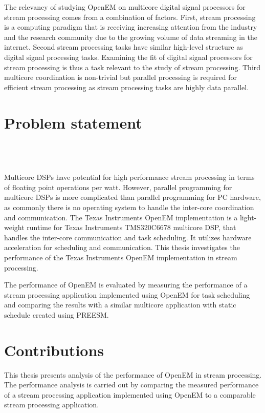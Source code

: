 The relevancy of studying OpenEM on multicore digital signal processors for stream processing comes from a combination of factors. First, stream processing is a computing paradigm that is receiving increasing attention from the industry and the research community due to the growing volume of data streaming in the internet. Second stream processing tasks have similar high-level structure as digital signal processing tasks. Examining the fit of digital signal processors for stream processing is thus a task relevant to the study of stream processing. Third multicore coordination is non-trivial but parallel processing is required for efficient stream processing as stream processing tasks are highly data parallel.

\section{Problem statement}
\label{section:problem-statement}
 \\
 \\
 \\
Multicore DSPs have potential for high performance stream processing in terms of floating point operations per watt. However, parallel programming for multicore DSPs is more complicated than parallel programming for PC hardware, as commonly there is no operating system to handle the inter-core coordination and communication. The Texas Instruments OpenEM implementation is a light-weight runtime for Texas Instruments TMS320C6678 multicore DSP, that handles the inter-core communication and task scheduling. It utilizes hardware acceleration for scheduling and communication. This thesis investigates the performance of the Texas Instruments OpenEM implementation in stream processing.

The performance of OpenEM is evaluated by measuring the performance of a stream processing application implemented using OpenEM for task scheduling and comparing the results with a similar multicore application with static schedule created using PREESM.

\section{Contributions}
\label{section:contributions}
This thesis presents analysis of the performance of OpenEM in stream processing. The performance analysis is carried out by comparing the measured performance of a stream processing application implemented using OpenEM to a comparable stream processing application.

